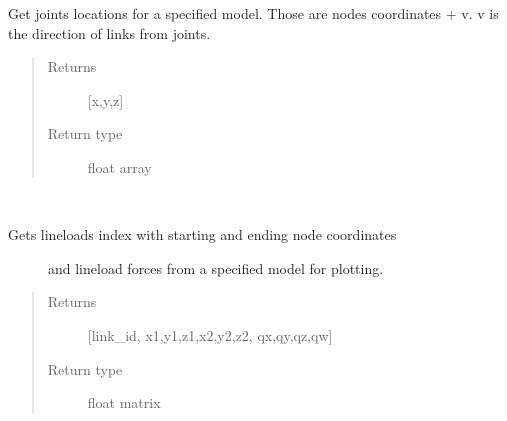\documentclass[letterpaper,10pt,english]{sphinxmanual}
\begin{document}
\begin{fulllineitems}

\begin{fulllineitems}
\label{\detokenize{api:beamon.database.database.Database.get_joints}}
Get joints locations for a specified model.
Those are nodes coordinates + v. v is the direction of links from joints.
\begin{quote}\begin{description}
\item[{Returns}] \leavevmode
{[}x,y,z{]}

\item[{Return type}] \leavevmode
float array

\end{description}\end{quote}

\end{fulllineitems}


\begin{fulllineitems}
\label{\detokenize{api:beamon.database.database.Database.get_lineloads_for_plotting}}~\begin{description}
\item[{Gets lineloads index with starting and ending node coordinates}] \leavevmode
and lineload forces from a specified model for plotting.

\end{description}
\begin{quote}\begin{description}
\item[{Returns}] \leavevmode
{[}link\_id, x1,y1,z1,x2,y2,z2, qx,qy,qz,qw{]}

\item[{Return type}] \leavevmode
float matrix

\end{description}\end{quote}


\end{fulllineitems}
\end{fulllineitems}
\end{document}
